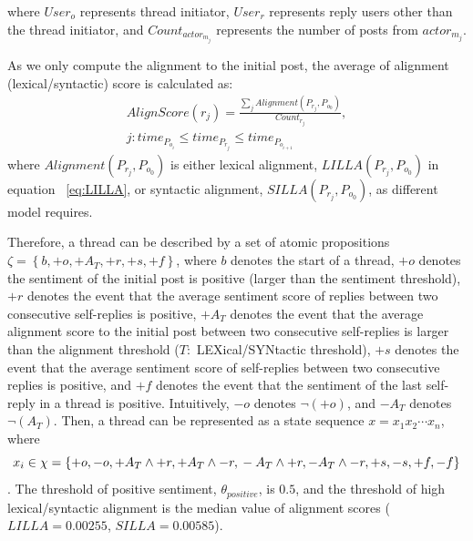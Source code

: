 \documentclass[man,biblatex,floatsintext]{apa6}
\begin{document}
where $User_{o}$ represents thread initiator, $User_{r}$ represents reply users other than the thread initiator, and $Count_{actor_{m_j}}$ represents the number of posts from $actor_{m_{j}}$. 

As we only compute the alignment to the initial post, the average of alignment (lexical/syntactic) score is calculated as: 
\begin{equation}
\begin{split}
AlignScore(r_{j})= \frac{\sum_{j} Alignment(P_{r_{j}},P_{o_{0}})}{Count_{r_{j}}},\\ j:time_{P_{o_{i}}} \leq time_{P_{r_{j}}} \leq time_{P_{o_{i+1}}}
\end{split}
\end{equation}
where $Alignment(P_{r_{j}},P_{o_{0}})$ is either lexical alignment, $LILLA(P_{r_{j}},P_{o_{0}})$ in equation ~\ref{eq:LILLA}, or syntactic alignment, $SILLA(P_{r_{j}},P_{o_{0}})$, as different model requires.


Therefore, a thread can be described by a set of atomic propositions $\zeta=\left \{b, +o, +A_T, +r, +s, +f \right \}$, where $b$ denotes the start of a thread, $+o$ denotes the sentiment of the initial post is positive (larger than the sentiment threshold), $+r$ denotes the event that the average sentiment score of replies between two consecutive self-replies is positive, $+A_T$ denotes the event that the average alignment score to the initial post between two consecutive self-replies is larger than the alignment threshold ($T:$ LEXical/SYNtactic threshold), $+s$ denotes the event that the average sentiment score of self-replies between two consecutive replies is positive, and $+f$ denotes the event that the sentiment of the last self-reply in a thread is positive. Intuitively, $-o$ denotes $\neg(+o)$, and $-A_T$ denotes $\neg(A_T)$. Then, a thread can be represented as a state sequence $x=x_{1}x_{2} \cdots x_{n}$, where 
\begin{dmath}
x_i \in \chi = \left \{+o, -o, +A_T\wedge+r, +A_T\wedge-r, \\ -A_T\wedge+r, -A_T\wedge-r, +s, -s, +f, -f \right \}
\end{dmath}.
The threshold of positive sentiment, $\theta_{positive}$, is $0.5$, and the threshold of high lexical/syntactic alignment is the median value of alignment scores ($LILLA = 0.00255$, $SILLA = 0.00585$). 
\end{document}
